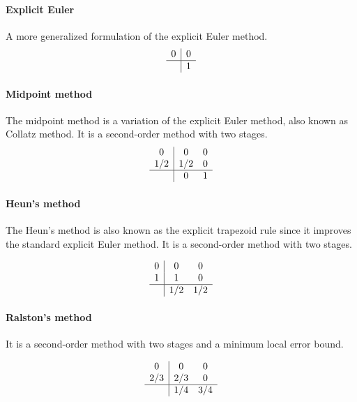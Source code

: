 \paragraph{Explicit Euler}
A more generalized formulation of the explicit Euler method.
\begin{equation}
	\begin{array}{c|c}
		0 & 0 \\ \hline
		  & 1  
	\end{array}
	\label{eq::explicit_euler}
\end{equation}

\paragraph{Midpoint method}
The midpoint method is a variation of the explicit Euler method,
also known as Collatz method. It is a second-order method with two stages.
\begin{equation}
	\begin{array}{c|cc}
		0   & 0   & 0 \\
		1/2 & 1/2 & 0 \\ \hline
		    & 0   & 1 
	\end{array}
	\label{eq:midpoint}
\end{equation}

\paragraph{Heun's method}
The Heun's method is also known as the explicit trapezoid rule
since it improves the standard explicit Euler method.
It is a second-order method with two stages.

\begin{equation}
	\begin{array}{c|cc}
		0      & 0   & 0 \\
		1      & 1   & 0 \\ \hline
		       & 1/2  & 1/2
	\end{array}
	\label{eq::heun}
\end{equation}

\paragraph{Ralston's method}
It is a second-order method with two stages and a minimum local error bound.

\begin{equation}
	\begin{array}{c|cc}
		0      & 0   & 0 \\
		2/3    & 2/3 & 0 \\ \hline
		       & 1/4 & 3/4
	\end{array}
	\label{eq::ralston}
\end{equation}

